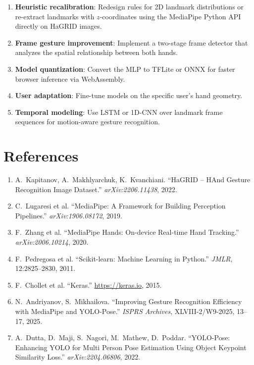 \documentclass[11pt,a4paper]{article}
\begin{document}
\begin{enumerate}
    \item \textbf{Heuristic recalibration}: Redesign rules for 2D landmark distributions or re-extract landmarks with $z$-coordinates using the MediaPipe Python API directly on HaGRID images.
    \item \textbf{Frame gesture improvement}: Implement a two-stage frame detector that analyzes the spatial relationship between both hands.
    \item \textbf{Model quantization}: Convert the MLP to TFLite or ONNX for faster browser inference via WebAssembly.
    \item \textbf{User adaptation}: Fine-tune models on the specific user's hand geometry.
    \item \textbf{Temporal modeling}: Use LSTM or 1D-CNN over landmark frame sequences for motion-aware gesture recognition.
\end{enumerate}

\section*{References}

\begin{enumerate}
    \item \label{ref:hagrid} A.~Kapitanov, A.~Makhlyarchuk, K.~Kvanchiani. ``HaGRID -- HAnd Gesture Recognition Image Dataset.'' \textit{arXiv:2206.11438}, 2022.

    \item \label{ref:mediapipe} C.~Lugaresi et al. ``MediaPipe: A Framework for Building Perception Pipelines.'' \textit{arXiv:1906.08172}, 2019.

    \item \label{ref:mediapipe-hands} F.~Zhang et al. ``MediaPipe Hands: On-device Real-time Hand Tracking.'' \textit{arXiv:2006.10214}, 2020.

    \item \label{ref:sklearn} F.~Pedregosa et al. ``Scikit-learn: Machine Learning in Python.'' \textit{JMLR}, 12:2825--2830, 2011.

    \item \label{ref:keras} F.~Chollet et al. ``Keras.'' \url{https://keras.io}, 2015.

    \item \label{ref:yolo-mediapipe} N.~Andriyanov, S.~Mikhailova. ``Improving Gesture Recognition Efficiency with MediaPipe and YOLO-Pose.'' \textit{ISPRS Archives}, XLVIII-2/W9-2025, 13--17, 2025.

    \item \label{ref:yolov8-pose} A.~Dutta, D.~Maji, S.~Nagori, M.~Mathew, D.~Poddar. ``YOLO-Pose: Enhancing YOLO for Multi Person Pose Estimation Using Object Keypoint Similarity Loss.'' \textit{arXiv:2204.06806}, 2022.
\end{enumerate}
\end{document}
